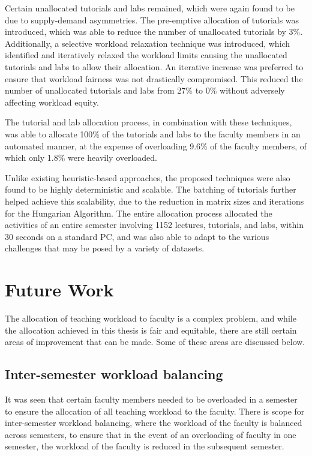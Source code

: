 Certain unallocated tutorials and labs remained, which were again found to be due to supply-demand asymmetries. The pre-emptive allocation of tutorials was introduced, which was able to reduce the number of unallocated tutorials by 3\%. Additionally, a selective workload relaxation technique was introduced, which identified and iteratively relaxed the workload limits causing the unallocated tutorials and labs to allow their allocation. An iterative increase was preferred to ensure that workload fairness was not drastically compromised. This reduced the number of unallocated tutorials and labs from 27\% to 0\% without adversely affecting workload equity.

The tutorial and lab allocation process, in combination with these techniques, was able to allocate 100\% of the tutorials and labs to the faculty members in an automated manner, at the expense of overloading 9.6\% of the faculty members, of which only 1.8\% were heavily overloaded.

Unlike existing heuristic-based approaches, the proposed techniques were also found to be highly deterministic and scalable. The batching of tutorials further helped achieve this scalability, due to the reduction in matrix sizes and iterations for the Hungarian Algorithm. The entire allocation process allocated the activities of an entire semester involving 1152 lectures, tutorials, and labs, within 30 seconds on a standard PC, and was also able to adapt to the various challenges that may be posed by a variety of datasets.

\section{Future Work}

The allocation of teaching workload to faculty is a complex problem, and while the allocation achieved in this thesis is fair and equitable, there are still certain areas of improvement that can be made. Some of these areas are discussed below.

\subsection{Inter-semester workload balancing}

It was seen that certain faculty members needed to be overloaded in a semester to ensure the allocation of all teaching workload to the faculty. There is scope for inter-semester workload balancing, where the workload of the faculty is balanced across semesters, to ensure that in the event of an overloading of faculty in one semester, the workload of the faculty is reduced in the subsequent semester.

